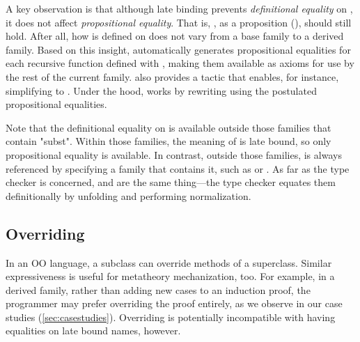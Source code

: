 A key observation is that although late binding
prevents \emph{definitional equality} on , it does not
affect \emph{propositional equality}.
That is, ,
as a proposition (), should still hold.
After all, how  is defined on  does not vary
from a base family to a derived family.
%
Based on this insight, \Lang automatically generates
propositional equalities for each recursive function defined with ,
making them available as axioms for use by the rest of the current family.
\Lang also provides a tactic  that enables, for instance,
simplifying  to .
Under the hood,  works by rewriting using the postulated
propositional equalities.

Note that the definitional equality on  is available
outside those families that contain "subst".
Within those families, the meaning of  is late bound, so only
propositional equality is available.
In contrast, outside those families,  is always referenced
by specifying a family that contains it, 
such as  or .
As far as the type checker is concerned,  and
 are the same thing---the type checker
equates them definitionally by unfolding  and
performing normalization.


\subsection{Overriding}
\label{sec:override}

In an OO language, a subclass can override methods of a superclass.
Similar expressiveness is useful for metatheory mechanization, too.
%
For example, in a derived family, rather than adding new cases to an
induction proof, the programmer may prefer overriding the proof
entirely, as we observe in our case studies (\cref{sec:casestudies}).
%
Overriding is potentially incompatible with having equalities on late bound names, however.

